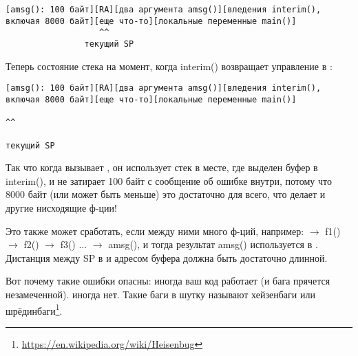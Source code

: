 \begin{lstlisting}
[amsg(): 100 байт][RA][два аргумента amsg()][вледения interim(), включая 8000 байт][еще что-то][локальные переменные main()]
                   ^^
                текущий SP
\end{lstlisting}

Теперь состояние стека на момент, когда interim() возвращает управление в \main{}:

\begin{lstlisting}
[amsg(): 100 байт][RA][два аргумента amsg()][вледения interim(), включая 8000 байт][еще что-то][локальные переменные main()]
                                                                                        ^^
                                                                                     текущий SP
\end{lstlisting}

Так что когда \main вызывает \printf, он использует стек в месте, где выделен буфер в interim(),
и не затирает 100 байт с сообщение об ошибке внутри, потому что 8000 байт (или может быть меньше) это достаточно для всего,
что делает \printf и другие нисходящие ф-ции!

Это также может сработать, если между ними много ф-ций, например:
\main $\rightarrow$ f1() $\rightarrow$ f2() $\rightarrow$ f3() ... $\rightarrow$ amsg(),
и тогда результат amsg() используется в \main.
Дистанция между \ac{SP} в \main и адресом буфера \TT{buf[]} должна быть достаточно длинной.

Вот почему такие ошибки опасны: иногда ваш код работает (и бага прячется незамеченной). иногда нет.
\label{heisenbug}
\myindex{Хейзенбаги}
Такие баги в шутку называют хейзенбаги или шрёдинбаги\footnote{\url{https://en.wikipedia.org/wiki/Heisenbug}}.

